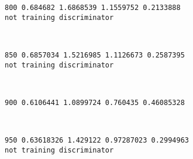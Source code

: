 \documentclass[11pt]{article}
\begin{document}
    \begin{Verbatim}[commandchars=\\\{\}]
800 0.684682 1.6868539 1.1559752 0.2133888
not training discriminator

    \end{Verbatim}

    \begin{center}
    \end{center}
    { \hspace*{\fill} \\}
    
    \begin{Verbatim}[commandchars=\\\{\}]
850 0.6857034 1.5216985 1.1126673 0.2587395
not training discriminator

    \end{Verbatim}

    \begin{center}
    \end{center}
    { \hspace*{\fill} \\}
    
    \begin{Verbatim}[commandchars=\\\{\}]
900 0.6106441 1.0899724 0.760435 0.46085328

    \end{Verbatim}

    \begin{center}
    \end{center}
    { \hspace*{\fill} \\}
    
    \begin{Verbatim}[commandchars=\\\{\}]
950 0.63618326 1.429122 0.97287023 0.2994963
not training discriminator

    \end{Verbatim}

    \begin{center}
    \end{center}
    { \hspace*{\fill} \\}
    
\end{document}

